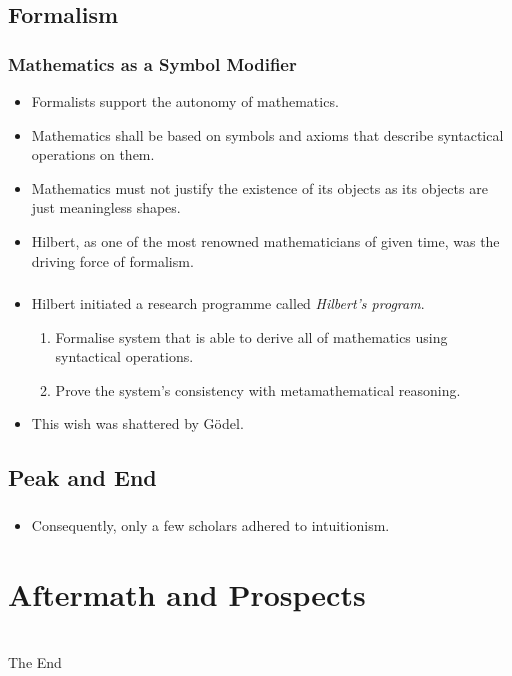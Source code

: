 \documentclass{beamer}
\begin{document}
\subsection{Formalism}
\begin{frame}
    \frametitle{Mathematics as a Symbol Modifier}
    \begin{itemize}[<+->]
	\item Formalists support the autonomy of mathematics.
	\item Mathematics shall be based on symbols and axioms that describe syntactical operations on them.
	\item Mathematics must not justify the existence of its objects as its objects are just meaningless shapes.
	\item Hilbert, as one of the most renowned mathematicians of given time, was the driving force of formalism.
    \end{itemize}
\end{frame}
\begin{frame}
    \frametitle{}
    \begin{itemize}[<+->]
	\item Hilbert initiated a research programme called \textit{Hilbert's program}.
	\begin{enumerate}
		\item Formalise system that is able to derive all of mathematics using syntactical operations.
		\item Prove the system's consistency with metamathematical reasoning.
	\end{enumerate}
	\item This wish was shattered by Gödel.
    \end{itemize}
\end{frame}
\subsection{Peak and End}
\begin{frame}
    \frametitle{}
    \begin{itemize}[<+->]
	\item Consequently, only a few scholars adhered to intuitionism.
    \end{itemize}
\end{frame}
\section{Aftermath and Prospects}
\begin{frame}
    \frametitle{}
\end{frame}
\section*{}
\begin{frame}
    \Huge{\centerline{The End}}
\end{frame}

\newpage


\end{document}
